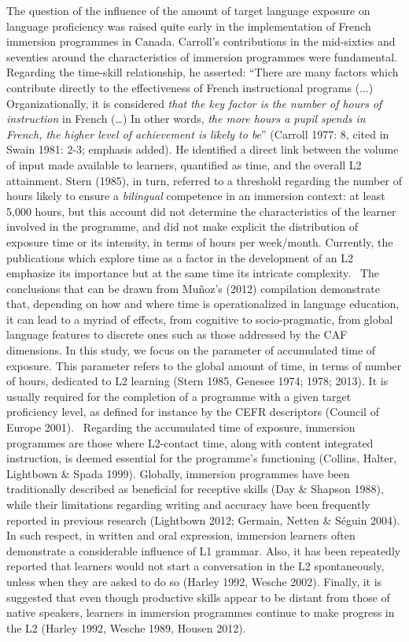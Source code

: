 \documentclass[12pt]{article}
\newenvironment{styleStandard}{\setlength\leftskip{0cm}\setlength\rightskip{0cm plus 1fil}\setlength\parindent{0cm}\setlength\parfillskip{0pt plus 1fil}\setlength\parskip{0in plus 1pt}\writerlistparindent\writerlistleftskip\leavevmode\normalfont\normalsize\writerlistlabel\ignorespaces}{\unskip\vspace{0.111in plus 0.0111in}\par}
\newcommand\writerlistleftskip{}
\newcommand\writerlistparindent{}
\newcommand\writerlistlabel{}
\begin{document}
\begin{styleStandard}
The question of the influence of the amount of target language exposure on language proficiency was raised quite early in the implementation of French immersion programmes in Canada. Carroll’s contributions in the mid-sixties and seventies around the characteristics of immersion programmes were fundamental. Regarding the time-skill relationship, he asserted: “There are many factors which contribute directly to the effectiveness of French instructional programs (...) Organizationally, it is considered \textit{that the key factor is the number of hours of instruction} in French (…) In other words, \textit{the more hours a pupil spends in French, the higher level of achievement is likely to b}\textit{e}” (Carroll 1977: 8, cited in Swain 1981: 2-3; emphasis added). He identified a direct link between the volume of input made available to learners, quantified as time, and the overall L2 attainment. Stern (1985), in turn, referred to a threshold regarding the number of hours likely to ensure a \textit{bilingual} competence in an immersion context: at least 5,000 hours, but this account did not determine the characteristics of the learner involved in the programme, and did not make explicit the distribution of exposure time or its intensity, in terms of hours per week/month. Currently, the publications which explore time as a factor in the development of an L2 emphasize its importance but at the same time its intricate complexity. \ The conclusions that can be drawn from Muñoz’s (2012) compilation demonstrate that, depending on how and where time is operationalized in language education, it can lead to a myriad of effects, from cognitive to socio-pragmatic, from global language features to discrete ones such as those addressed by the CAF dimensions. In this study, we focus on the parameter of accumulated time of exposure\textit{.} This parameter refers to the global amount of time, in terms of number of hours, dedicated to L2 learning (Stern 1985, Genesee 1974; 1978; 2013). It is usually required for the completion of a programme with a given target proficiency level, as defined for instance by the CEFR descriptors (Council of Europe 2001). \ Regarding the accumulated time of exposure, immersion programmes are those where L2-contact time, along with content integrated instruction, is deemed essential for the programme’s functioning (Collins, Halter, Lightbown \& Spada 1999). Globally, immersion programmes have been traditionally described as beneficial for receptive skills (Day \& Shapson 1988), while their limitations regarding writing and accuracy have been frequently reported in previous research (Lightbown 2012; Germain, Netten \& Séguin 2004). In such respect, in written and oral expression, immersion learners often demonstrate a considerable influence of L1 grammar. Also, it has been repeatedly reported that learners would not start a conversation in the L2 spontaneously, unless when they are asked to do so (Harley 1992, Wesche 2002). Finally, it is suggested that even though productive skills appear to be distant from those of native speakers, learners in immersion programmes continue to make progress in the L2 (Harley 1992, Wesche 1989, Housen 2012).
\end{styleStandard}
\end{document}
